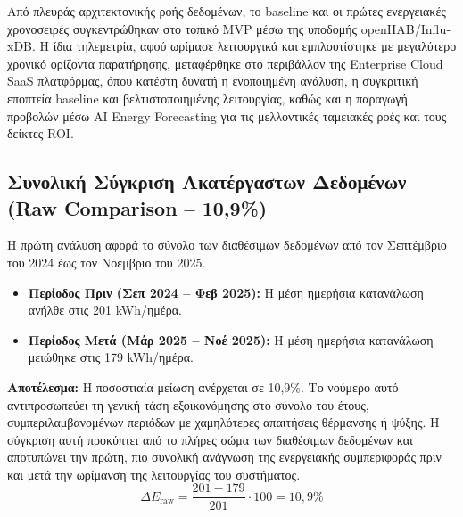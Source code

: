 Από πλευράς αρχιτεκτονικής ροής δεδομένων, το \textlatin{baseline} και οι πρώτες ενεργειακές χρονοσειρές συγκεντρώθηκαν στο τοπικό \textlatin{MVP} μέσω της υποδομής \textlatin{openHAB}/\textlatin{InfluxDB}. Η ίδια τηλεμετρία, αφού ωρίμασε λειτουργικά και εμπλουτίστηκε με μεγαλύτερο χρονικό ορίζοντα παρατήρησης, μεταφέρθηκε στο περιβάλλον της \textlatin{Enterprise Cloud SaaS} πλατφόρμας, όπου κατέστη δυνατή η ενοποιημένη ανάλυση, η συγκριτική εποπτεία \textlatin{baseline} και βελτιστοποιημένης λειτουργίας, καθώς και η παραγωγή προβολών μέσω \textlatin{AI Energy Forecasting} για τις μελλοντικές ταμειακές ροές και τους δείκτες \textlatin{ROI}.

\subsection{Συνολική Σύγκριση Ακατέργαστων Δεδομένων (Raw Comparison -- 10,9\%)}
Η πρώτη ανάλυση αφορά το σύνολο των διαθέσιμων δεδομένων από τον Σεπτέμβριο του 2024 έως τον Νοέμβριο του 2025.
\begin{itemize}
\item \textbf{Περίοδος Πριν (Σεπ 2024 -- Φεβ 2025):} Η μέση ημερήσια κατανάλωση ανήλθε στις 201 \textlatin{kWh}/ημέρα.
\item \textbf{Περίοδος Μετά (Μάρ 2025 -- Νοέ 2025):} Η μέση ημερήσια κατανάλωση μειώθηκε στις 179 \textlatin{kWh}/ημέρα.
\end{itemize}
\textbf{Αποτέλεσμα:} Η ποσοστιαία μείωση ανέρχεται σε 10,9\%. Το νούμερο αυτό αντιπροσωπεύει τη γενική τάση εξοικονόμησης στο σύνολο του έτους, συμπεριλαμβανομένων περιόδων με χαμηλότερες απαιτήσεις θέρμανσης ή ψύξης. Η σύγκριση αυτή προκύπτει από το πλήρες σώμα των διαθέσιμων δεδομένων και αποτυπώνει την πρώτη, πιο συνολική ανάγνωση της ενεργειακής συμπεριφοράς πριν και μετά την ωρίμανση της λειτουργίας του συστήματος.
\begin{equation}
\Delta E_{\text{raw}} = \frac{201-179}{201}\cdot 100 = 10{,}9\%
\end{equation}

